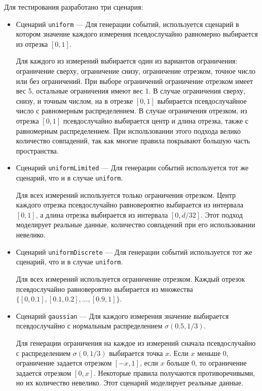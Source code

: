 \documentclass[14pt]{article}
\begin{document}
Для тестирования разработано три сценария:
\begin{itemize}
    \item Сценарий \verb|uniform| --- Для генерации событий, используется сценарий в котором значение каждого измерения псевдослучайно равномерно выбирается из отрезка $[0, 1]$.

    Для каждого из измерений выбирается один из вариантов ограничения: ограничение сверху, ограничение снизу, ограничение отрезком, точное число или без ограничений. При выборе ограничений ограничение отрезком имеет вес 5, остальные ограничения имеют вес 1. В случае ограничения сверху, снизу, и точным числом, на в отрезке $[0, 1]$ выбирается псевдослучайное число с равномерным распределением. В случае ограничения отрезком, из отрезка $[0, 1]$ псевдослучайно выбирается центр и длина отрезка, также с равномерным распределением. При использовании этого подхода велико количество совпадений, так как многие правила покрывают большую часть пространства.

    \item Сценарий \verb|uniformLimited| --- Для генерации событий используется тот же сценарий, что и в случае \verb|uniform|.

    Для всех измерений используется только ограничения отрезком. Центр каждого отрезка псевдослучайно равновероятно выбирается из интервала $[0, 1]$, а длина отрезка выбирается из интервала $[0, d / 32]$. Этот подход моделирует реальные данные, количество совпадений при его использовании невелико.

    \item Сценарий \verb|uniformDiscrete| --- Для генерации событий используется тот же сценарий, что и в случае \verb|uniform|.

    Для всех измерений используется ограничение отрезком. Каждый отрезок псевдослучайно равновероятно выбирается из множества\\ $\{[0, 0.1], [0.1, 0.2],\dots,[0.9, 1]\}$.

    \item Сценарий \verb|gaussian| --- Для каждого измерения значение выбирается псевдослучайно с нормальным распределением $\sigma(0.5, 1/3)$.

    Для генерации ограничения на каждое из измерений сначала псевдослучайно с распределением $\sigma(0, 1/3)$ выбирается точка $x$. Если $x$ меньше 0, ограничение задается отрезком $[-x, 1]$, если $x$ больше 0, то ограничение задается отрезком $[0, x]$. Некоторые правила получаются противоречивыми, но их количество невелико. Этот сценарий моделирует реальные данные.

\end{itemize}
\end{document}
